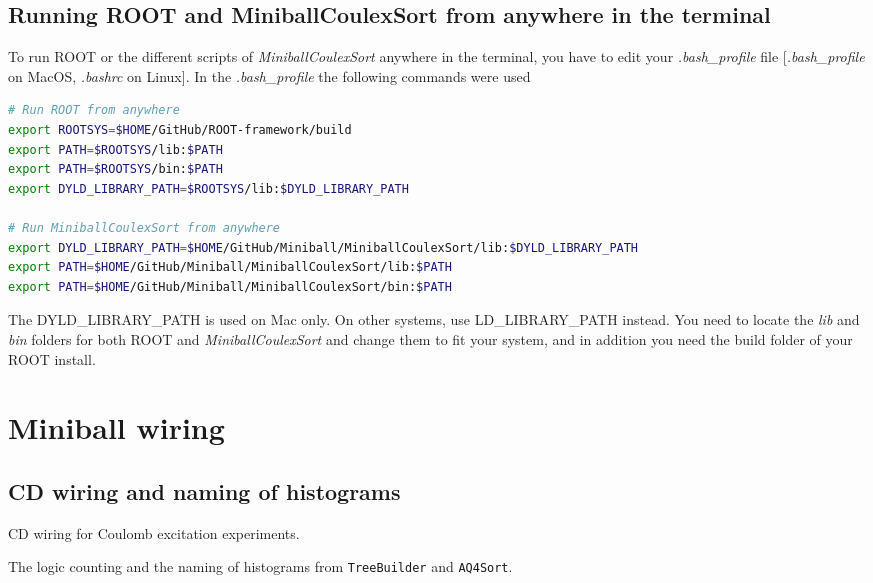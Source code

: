 \documentclass[twoside,english]{uiofysmaster/uiofysmaster}
\begin{document}
\begin{appendices}
\section{Running ROOT and MiniballCoulexSort from anywhere in the terminal}
To run ROOT or the different scripts of \textsl{MiniballCoulexSort} anywhere in the terminal, you have to edit your \textit{.bash\_profile} file [\textit{.bash\_profile} on MacOS, \textit{.bashrc} on Linux]. In the \textit{.bash\_profile} the following commands were used 
\begin{lstlisting}[language=sh]
# Run ROOT from anywhere
export ROOTSYS=$HOME/GitHub/ROOT-framework/build
export PATH=$ROOTSYS/lib:$PATH
export PATH=$ROOTSYS/bin:$PATH
export DYLD_LIBRARY_PATH=$ROOTSYS/lib:$DYLD_LIBRARY_PATH

# Run MiniballCoulexSort from anywhere
export DYLD_LIBRARY_PATH=$HOME/GitHub/Miniball/MiniballCoulexSort/lib:$DYLD_LIBRARY_PATH
export PATH=$HOME/GitHub/Miniball/MiniballCoulexSort/lib:$PATH
export PATH=$HOME/GitHub/Miniball/MiniballCoulexSort/bin:$PATH
\end{lstlisting}
The DYLD\_LIBRARY\_PATH is used on Mac only. On other systems, use \newline LD\_LIBRARY\_PATH instead. You need to locate the \textit{lib} and \textit{bin} folders for both ROOT and \textsl{MiniballCoulexSort} and change them to fit your system, and in addition you need the build folder of your ROOT install.



\chapter{Miniball wiring}

\section{CD wiring and naming of histograms}

\begin{table}[ht] 
	\centering 
	\caption{CD wiring for Coulomb excitation experiments.}
	
	\label{tab:ADC}
\end{table}


\begin{table}[ht] 
	\centering 
	\caption{The logic counting and the naming of histograms from \texttt{TreeBuilder} and \texttt{AQ4Sort}.}
	
	\label{tab:TBvsAQ4}
\end{table}




\end{appendices}
\end{document}
